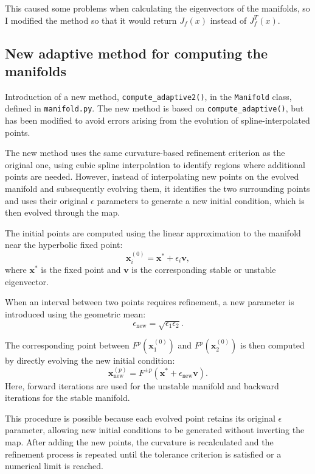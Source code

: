 This caused some problems when calculating the eigenvectors of the manifolds, so I modified the method so that it would return $J_f(x)$ instead of $J_f^T(x)$.


\subsection{New adaptive method for computing the manifolds}

Introduction of a new method, \texttt{compute\_adaptive2()}, in the \texttt{Manifold} class, defined in \texttt{manifold.py}. The new method is based on \texttt{compute\_adaptive()}, but has been modified to avoid errors arising from the evolution of spline-interpolated points.

The new method uses the same curvature-based refinement criterion as the original one, using cubic spline interpolation to identify regions where additional points are needed. However, instead of interpolating new points on the evolved manifold and subsequently evolving them, it identifies the two surrounding points and uses their original $\epsilon$ parameters to generate a new initial condition, which is then evolved through the map.

The initial points are computed using the linear approximation to the manifold near the hyperbolic fixed point:
\begin{equation}
    \mathbf{x}_i^{(0)} = \mathbf{x}^* + \epsilon_i \mathbf{v},
\end{equation}
where $\mathbf{x}^*$ is the fixed point and $\mathbf{v}$ is the corresponding stable or unstable eigenvector.

When an interval between two points requires refinement, a new parameter is introduced using the geometric mean:
\begin{equation}
    \epsilon_{\mathrm{new}} = \sqrt{\epsilon_1 \epsilon_2}.
\end{equation}

The corresponding point between $F^p(\mathbf{x}_1^{(0)})$ and $F^p(\mathbf{x}_2^{(0)})$ is then computed by directly evolving the new initial condition:
\begin{equation}
    \boxed{
    \mathbf{x}_{\mathrm{new}}^{(p)}
    = F^{\pm p}\left(\mathbf{x}^* + \epsilon_{\mathrm{new}}\mathbf{v}\right).
    }
\end{equation}
Here, forward iterations are used for the unstable manifold and backward iterations for the stable manifold.

This procedure is possible because each evolved point retains its original $\epsilon$ parameter, allowing new initial conditions to be generated without inverting the map. After adding the new points, the curvature is recalculated and the refinement process is repeated until the tolerance criterion is satisfied or a numerical limit is reached.


